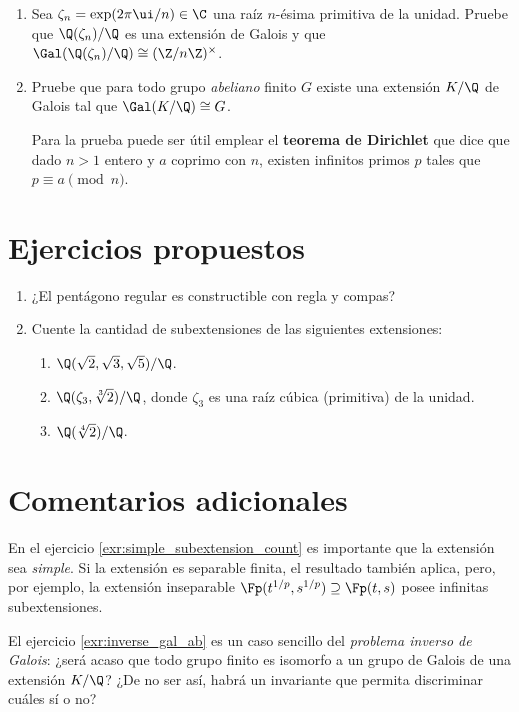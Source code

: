\documentclass[11pt, reqno]{amsart}
\begin{document}
\begin{enumerate}
	\item\lookright
		Sea $\zeta_n = \exp(2\pi\ui / n) \in \C$ una raíz $n$-ésima primitiva de la unidad.
		Pruebe que $\Q(\zeta_n)/\Q$ es una extensión de Galois y que $\Gal(\Q(\zeta_n)/\Q) \cong
		(\Z/n\Z)^\times$.

	\item\label{exr:inverse_gal_ab}\lookst Pruebe que para todo grupo \emph{abeliano} finito $G$ existe una extensión $K/\Q$ de Galois tal que
		$\Gal(K/\Q) \cong G$.

		\begin{hint}
			Para la prueba puede ser útil emplear el \textbf{teorema de Dirichlet} que dice que
			dado $n > 1$ entero y $a$ coprimo con $n$, existen infinitos primos $p$ tales que $p \equiv a
			\pmod n$.
		\end{hint}
\end{enumerate}

\appendix
\section{Ejercicios propuestos}
\begin{enumerate}
	\item ¿El pentágono regular es constructible con regla y compas?
	\item Cuente la cantidad de subextensiones de las siguientes extensiones:
		\begin{enumerate}
			\item $\Q(\sqrt{2}, \sqrt{3}, \sqrt{5})/\Q$.
			\item $\Q(\zeta_3, \sqrt[3]{2})/\Q$, donde $\zeta_3$ es una raíz cúbica (primitiva) de la unidad.
			\item $\Q(\sqrt[4]{2})/\Q$.
		\end{enumerate}
\end{enumerate}

\section{Comentarios adicionales}
En el ejercicio \ref{exr:simple_subextension_count} es importante que la extensión sea \emph{simple}.
Si la extensión es separable finita, el resultado también aplica, pero, por ejemplo, la extensión inseparable
$\Fp(t^{1/p}, s^{1/p}) \supseteq \Fp(t, s)$ posee infinitas subextensiones.

El ejercicio \ref{exr:inverse_gal_ab} es un caso sencillo del \emph{problema inverso de Galois}: ¿será acaso que todo
grupo finito es isomorfo a un grupo de Galois de una extensión $K/\Q$? ¿De no ser así, habrá un invariante que
permita discriminar cuáles sí o no?

\nocite{jacobson:basic, lang:algebra}
\printbibliography
\end{document}
